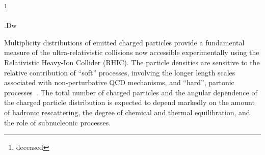 \documentclass[singlespacing]{elsart}
\begin{document}
\begin{frontmatter}
\address[bnl]{Brookhaven National Laboratory, Upton,New York 11973}
\address[ires]{Institut de Recherches Subatomiques and Universit{\'e} 
Louis Pasteur, Strasbourg, France}
\address[kraknuc]{Institute of Nuclear Physics, Krakow, Poland}
\address[krakow]{Jagiellonian University, Krakow, Poland}
\address[baltimore]{Johns Hopkins University, Baltimore,Maryland 21218}
\address[newyork]{New York University, New York, New York 10003}
\address[nbi]{Niels Bohr Institute, University of Copenhagen, Denmark}
\address[texas]{Texas A$\&$M University, College Station,Texas 77843}
\address[bergen]{Department of Physics, University of Bergen, Bergen,Norway}
\address[bucharest]{University of Bucharest,Romania}
\address[kansas]{Department of Physics and Astronomy, University of Kansas, Lawrence, Kansas 66045}
\address[oslo]{Department of Physics, University of Oslo, Oslo,Norway}
\thanks[deceased]{deceased}
\begin{abstract}
We present charged particle densities as a function of pseudorapidity and
collision centrality for the $^{197}$Au+$^{197}$Au reaction
at $\sqrt{s_{NN}}$=130 GeV.  An integral charged particle multiplicity of
3860$\pm$300 is found for the 5\% most central events within the 
pseudorapidity range $-4.7\le \eta \le 4.7$.  At mid-rapidity an
enhancement in the particle yields per 
participant nucleon pair is observed for central events.
Near to the beam rapidity, 
a scaling of the particle yields consistent with
the ``limiting fragmentation'' picture is observed.  
Our results are compared to other recent 
experimental and theoretical discussions
of charged particle densities in ultra-relativistic heavy-ion collisions.
\end{abstract}

\begin{keyword}

.Dw
\end{keyword}
\end{frontmatter}


Multiplicity distributions of emitted 
charged particles  provide a fundamental measure
of the ultra-relativistic collisions 
now accessible experimentally using 
the Relativistic Heavy-Ion Collider (RHIC).  
The particle densities are sensitive to the
relative contribution of ``soft'' processes, involving the 
longer length scales associated with non-perturbative
QCD mechanisms,  and ``hard'',  
partonic processes~\cite{wang00,eskola00}. 
The total number of charged particles and the 
angular dependence of the charged particle  distribution 
is expected to depend  markedly on the amount of hadronic rescattering, 
the degree of chemical  and thermal equilibration, and the role of 
subnucleonic processes. 
 
\end{document}
